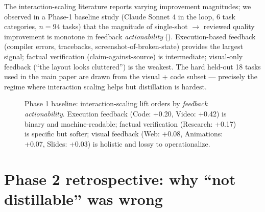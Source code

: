 \documentclass[11pt]{article}
\begin{document}
The interaction-scaling literature reports varying improvement magnitudes; we observed in a Phase-1 baseline study (Claude Sonnet 4 in the loop, 6 task categories, $n{=}94$ tasks) that the magnitude of single-shot $\to$ reviewed quality improvement is monotone in feedback \emph{actionability} (). Execution-based feedback (compiler errors, tracebacks, screenshot-of-broken-state) provides the largest signal; factual verification (claim-against-source) is intermediate; visual-only feedback (``the layout looks cluttered'') is the weakest. The hard held-out 18 tasks used in the main paper are drawn from the visual + code subset --- precisely the regime where interaction scaling helps but distillation is hardest.

\begin{figure}[ht]
\centering
{}
\caption{Phase 1 baseline: interaction-scaling lift orders by \emph{feedback actionability}. Execution feedback (Code: +0.20, Video: +0.42) is binary and machine-readable; factual verification (Research: +0.17) is specific but softer; visual feedback (Web: +0.08, Animations: +0.07, Slides: +0.03) is holistic and lossy to operationalize.}
\label{fig:actionability}
\end{figure}

\section{Phase 2 retrospective: why ``not distillable'' was wrong}
\label{app:phase2}
\end{document}
